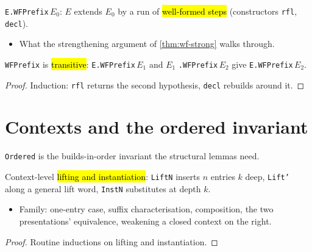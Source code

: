 \begin{definition}
\label{def:wfprefix}
\leanok
{}

 \texttt{E.WFPrefix}\,$E_0$: $E$ extends $E_0$ by a run of \hl{well-formed
steps} (constructors \texttt{rfl}, \texttt{decl}).
\begin{itemize}
\item What the strengthening argument of \ref{thm:wf-strong} walks through.
\end{itemize}
\end{definition}

\begin{lemma}
\label{thm:wfprefix-trans}
\leanok
{}

 \texttt{WFPrefix} is \hl{transitive}: \texttt{E.WFPrefix}\,$E_1$ and $E_1$
\texttt{.WFPrefix}\,$E_2$ give \texttt{E.WFPrefix}\,$E_2$.
\end{lemma}
\begin{proof}
\leanok
{} Induction: \texttt{rfl} returns the second hypothesis, \texttt{decl} rebuilds
around it.
\end{proof}

\section{Contexts and the ordered invariant}

\texttt{Ordered} is the builds-in-order invariant the structural lemmas need.

\begin{lemma}
\label{fam:ctx-lift}
\leanok
{}

 Context-level \hl{lifting and instantiation}: \texttt{LiftN} inserts $n$
entries $k$ deep, \texttt{Lift'} along a general lift word, \texttt{InstN} substitutes at
depth $k$.
\begin{itemize}
\item Family: one-entry case, suffix characterisation, composition, the two presentations'
  equivalence, weakening a closed context on the right.
\end{itemize}
\end{lemma}
\begin{proof}
\leanok
{} Routine inductions on lifting and instantiation.
\end{proof}

